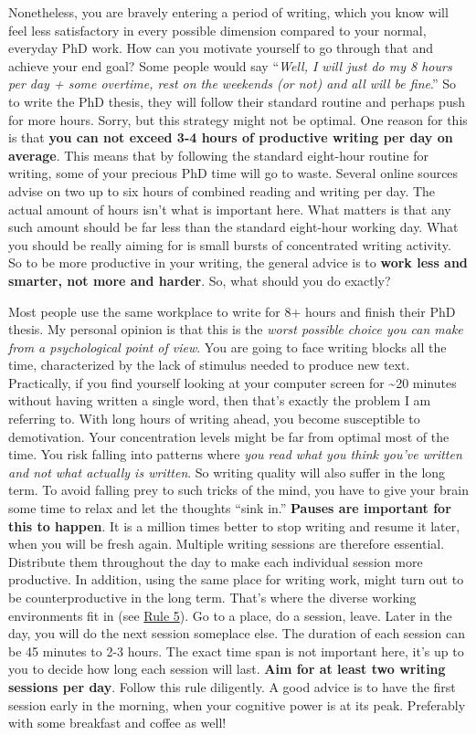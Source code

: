 \documentclass[
  12pt,
]{book}
\begin{document}
Nonetheless, you are bravely entering a period of writing, which you know will feel less satisfactory in every possible dimension compared to your normal, everyday PhD work.
How can you motivate yourself to go through that and achieve your end goal?
Some people would say ``\emph{Well, I will just do my 8 hours per day + some overtime, rest on the weekends (or not) and all will be fine}.''
So to write the PhD thesis, they will follow their standard routine and perhaps push for more hours.
Sorry, but this strategy might not be optimal.
One reason for this is that \textbf{you can not exceed 3-4 hours of productive writing per day on average}.
This means that by following the standard eight-hour routine for writing, some of your precious PhD time will go to waste.
Several online sources advise on two up to six hours of combined reading and writing per day.
The actual amount of hours isn't what is important here.
What matters is that any such amount should be far less than the standard eight-hour working day.
What you should be really aiming for is small bursts of concentrated writing activity.
So to be more productive in your writing, the general advice is to \textbf{work less and smarter, not more and harder}.
So, what should you do exactly?

Most people use the same workplace to write for 8+ hours and finish their PhD thesis.
My personal opinion is that this is the \emph{worst possible choice you can make from a psychological point of view}.
You are going to face writing blocks all the time, characterized by the lack of stimulus needed to produce new text.
Practically, if you find yourself looking at your computer screen for \textasciitilde20 minutes without having written a single word, then that's exactly the problem I am referring to.
With long hours of writing ahead, you become susceptible to demotivation.
Your concentration levels might be far from optimal most of the time.
You risk falling into patterns where \emph{you read what you think you've written and not what actually is written}.
So writing quality will also suffer in the long term.
To avoid falling prey to such tricks of the mind, you have to give your brain some time to relax and let the thoughts ``sink in.''
\textbf{Pauses are important for this to happen}.
It is a million times better to stop writing and resume it later, when you will be fresh again.
Multiple writing sessions are therefore essential.
Distribute them throughout the day to make each individual session more productive.
In addition, using the same place for writing work, might turn out to be counterproductive in the long term.
That's where the diverse working environments fit in (see \protect\hyperlink{rule5}{Rule 5}).
Go to a place, do a session, leave.
Later in the day, you will do the next session someplace else.
The duration of each session can be 45 minutes to 2-3 hours.
The exact time span is not important here, it's up to you to decide how long each session will last.
\textbf{Aim for at least two writing sessions per day}.
Follow this rule diligently.
A good advice is to have the first session early in the morning, when your cognitive power is at its peak.
Preferably with some breakfast and coffee as well!
\end{document}
